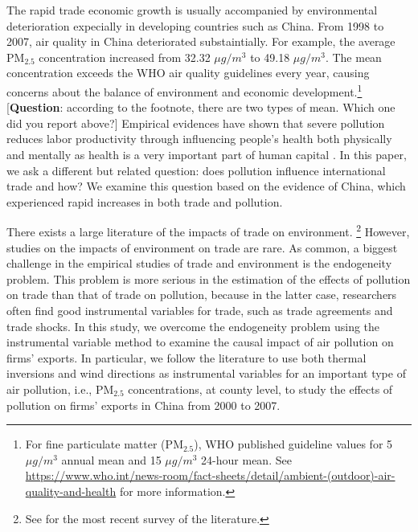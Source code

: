 \documentclass[12pt]{article}
\begin{document}
\label{sec:1} The rapid trade economic growth is usually accompanied by
environmental deterioration expecially in developing countries such as
China. From 1998 to 2007, air quality in China deteriorated substaintially.
For example, the average $\mathrm{PM_{2.5}}$ concentration increased from
32.32 $\mu g/m^{3}$ to 49.18 $\mu g/m^{3}$. The mean concentration exceeds
the WHO air quality guidelines every year, causing concerns about the
balance of environment and economic development.\footnote{%
For fine particulate matter ($\mathrm{PM_{2.5}}$), WHO published guideline
values for 5 $\mu g/m^{3}$ annual mean and 15 $\mu g/m^{3}$ 24-hour mean.
See %
\url{https://www.who.int/news-room/fact-sheets/detail/ambient-(outdoor)-air-quality-and-health}
for more information.} [\textbf{Question}: according to the footnote, there
are two types of mean. Which one did you report above?] Empirical evidences
have shown that severe pollution reduces labor productivity through
influencing people's health both physically and mentally as health is a very
important part of human capital %
\citep{graff2012impact,chang2016particulate,zhang2018impact,fu2021air,somanathan2021impact,Adhvaryu2022}%
. In this paper, we ask a different but related question: does pollution
influence international trade and how? We examine this question based on the
evidence of China, which experienced rapid increases in both trade and
pollution.

There exists a large literature of the impacts of trade on environment.%
\footnote{%
See \cite{cherniwchan2017trade} for the most recent survey of the literature.%
} However, studies on the impacts of environment on trade are rare. As
common, a biggest challenge in the empirical studies of trade and
environment is the endogeneity problem. This problem is more serious in the
estimation of the effects of pollution on trade than that of trade on
pollution, because in the latter case, researchers often find good
instrumental variables for trade, such as trade agreements and trade shocks.
In this study, we overcome the endogeneity problem using the instrumental
variable method to examine the causal impact of air pollution on firms'
exports. In particular, we follow the literature 
\citep{fu2021air,
khanna2021productivity, chen2022effect} to use both thermal inversions and
wind directions as instrumental variables for an important type of air
pollution, i.e., $\mathrm{PM_{2.5}}$ concentrations, at county level, to
study the effects of pollution on firms' exports in China from 2000 to 2007.
\end{document}
